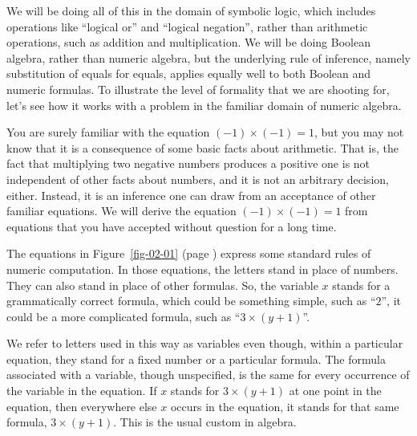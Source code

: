 We will be doing all of this in the domain of symbolic logic, which
includes operations like ``logical or'' and ``logical negation'',
rather than arithmetic operations, such as addition and
multiplication.
We will be doing Boolean algebra, rather than numeric algebra,
but the underlying rule of inference, namely
substitution
of equals for equals,
applies equally well to both Boolean and numeric formulas.
To illustrate the level of formality that we are shooting for,
let's see how it works with a problem
in the familiar domain of numeric algebra.

You are surely familiar with the equation $(-1)\times(-1) = 1$, but you may
not know that it is a consequence of some basic facts about
arithmetic.
That is, the fact that multiplying two
negative numbers produces a positive one
is not independent of other facts about numbers,
and it is not an arbitrary decision, either.
Instead, it is an inference one can draw
from an acceptance of other familiar equations.
We will derive the equation $(-1)\times(-1) = 1$
from equations that you have accepted without question for a long time.

The equations in Figure~\ref{fig-02-01} (page \pageref{fig-02-01})
express some standard rules of numeric computation.
In those equations, the letters stand in
place of numbers. They can also stand in place of other
formulas.
So, the variable $x$ stands for a grammatically correct formula,
which could be something simple, such as ``$2$'',
it could be a more complicated formula, such as ``$3\times(y + 1)$''.

We refer to letters used in this way as
variables even though, within a particular equation, they
stand for a fixed number or a particular formula.
The formula associated with a variable, though unspecified,
is the same for every occurrence of the variable in the equation.
If $x$ stands for $3\times(y + 1)$ at one point in the
equation, then everywhere else $x$ occurs in the equation,
it stands for that same formula, $3\times(y + 1)$.
This is the usual custom in algebra.


